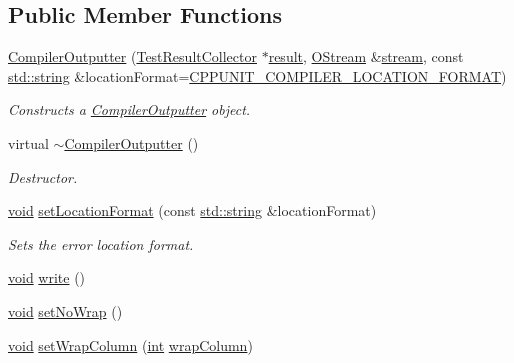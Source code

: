 \subsection*{Public Member Functions}
\begin{DoxyCompactItemize}
\item 
\hyperlink{class_compiler_outputter_a8dd6679e24c18b3ca54a4266d9d1b812}{Compiler\-Outputter} (\hyperlink{class_test_result_collector}{Test\-Result\-Collector} $\ast$\hyperlink{glew_8h_a5fb5836a37f7607602a16ad733ed6357}{result}, \hyperlink{_stream_8h_a80291a4e32881b445c8d4f839a9dd979}{O\-Stream} \&\hyperlink{glew_8h_a10d3bc96cdfc1d478f52c13d5ffd9316}{stream}, const \hyperlink{glew_8h_ae84541b4f3d8e1ea24ec0f466a8c568b}{std\-::string} \&location\-Format=\hyperlink{_portability_8h_a17c58ff0a5526dbcd28ebe3af5e7f04d}{C\-P\-P\-U\-N\-I\-T\-\_\-\-C\-O\-M\-P\-I\-L\-E\-R\-\_\-\-L\-O\-C\-A\-T\-I\-O\-N\-\_\-\-F\-O\-R\-M\-A\-T})
\begin{DoxyCompactList}\small\item\em Constructs a \hyperlink{class_compiler_outputter}{Compiler\-Outputter} object. \end{DoxyCompactList}\item 
virtual \hyperlink{class_compiler_outputter_ac74daaf4b355850c5e70b743aac2df82}{$\sim$\-Compiler\-Outputter} ()
\begin{DoxyCompactList}\small\item\em Destructor. \end{DoxyCompactList}\item 
\hyperlink{wglew_8h_aeea6e3dfae3acf232096f57d2d57f084}{void} \hyperlink{class_compiler_outputter_a0d9e67c7bdcb443b0b2754d61a10790c}{set\-Location\-Format} (const \hyperlink{glew_8h_ae84541b4f3d8e1ea24ec0f466a8c568b}{std\-::string} \&location\-Format)
\begin{DoxyCompactList}\small\item\em Sets the error location format. \end{DoxyCompactList}\item 
\hyperlink{wglew_8h_aeea6e3dfae3acf232096f57d2d57f084}{void} \hyperlink{class_compiler_outputter_a55ca2189956b9b52bdfb1802bf8da445}{write} ()
\item 
\hyperlink{wglew_8h_aeea6e3dfae3acf232096f57d2d57f084}{void} \hyperlink{class_compiler_outputter_aaa1d8281f8973552a8e9a4568b7d90b4}{set\-No\-Wrap} ()
\item 
\hyperlink{wglew_8h_aeea6e3dfae3acf232096f57d2d57f084}{void} \hyperlink{class_compiler_outputter_ab3559c2aaa88cbccb7c3823b3dd4d247}{set\-Wrap\-Column} (\hyperlink{wglew_8h_a500a82aecba06f4550f6849b8099ca21}{int} \hyperlink{class_compiler_outputter_a44a670371d545db99603ce88b59aa6c0}{wrap\-Column})

\end{DoxyCompactItemize}
